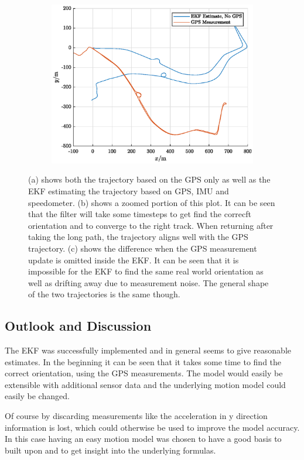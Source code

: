 \documentclass[11pt,a4paper]{article}
\begin{document}
\begin{figure}[htp]
	    \begin{subfigure}[b]{0.48\textwidth}
	        \includegraphics[width=\textwidth]{figures/no_gps.eps}
	    \end{subfigure}
	    \caption{(a) shows both the trajectory based on the GPS only as well as the EKF estimating the trajectory based on GPS, IMU and speedometer. (b) shows a zoomed portion of this plot. It can be seen that the filter will take some timesteps to get find the correcft orientation and to converge to the right track. When returning after taking the long path, the trajectory aligns well with the GPS trajectory. (c) shows the difference when the GPS measurement update is omitted inside the EKF. It can be seen that it is impossible for the EKF to find the same real world orientation as well as drifting away due to measurement noise. The general shape of the two trajectories is the same though.}
	    \label{fig:ekf}
	\end{figure}
	
	\subsection{Outlook and Discussion}
	The EKF was successfully implemented and in general seems to give reasonable estimates. In the beginning it can be seen that it takes some time to find the correct orientation, using the GPS measurements. The model would easily be extensible with additional sensor data and the underlying motion model could easily be changed. 
	
	Of course by discarding measurements like the acceleration in y direction information is lost, which could otherwise be used to improve the model accuracy. In this case having an easy motion model was chosen to have a good basis to built upon and to get insight into the underlying formulas.
	
\end{document}
